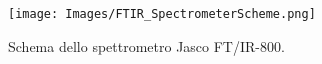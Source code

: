 \begin{figure}[h!]
    \centering
    \texttt{[image: Images/FTIR\_SpectrometerScheme.png]}
    \caption{Schema dello spettrometro Jasco FT/IR-800.}
    \label{fig:my_label}
\end{figure}